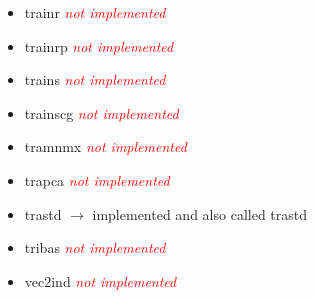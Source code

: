 \begin{itemize}
	\item trainr \textcolor{red}{\textit{not implemented}}
	\item trainrp \textcolor{red}{\textit{not implemented}}
	\item trains \textcolor{red}{\textit{not implemented}}
	\item trainscg \textcolor{red}{\textit{not implemented}}
	\item tramnmx \textcolor{red}{\textit{not implemented}}
	\item trapca \textcolor{red}{\textit{not implemented}}
	\item trastd $\rightarrow$ implemented and also called trastd
	\item tribas \textcolor{red}{\textit{not implemented}}
	\item vec2ind \textcolor{red}{\textit{not implemented}}
\end{itemize} 